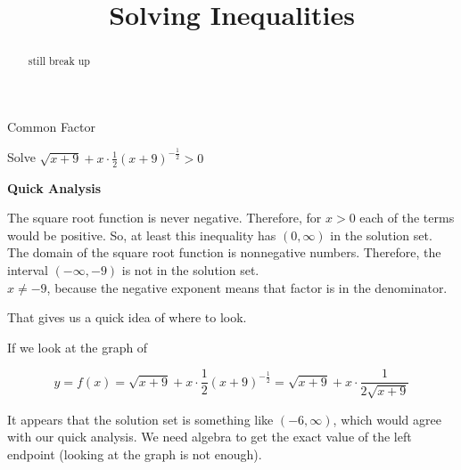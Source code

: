 \documentclass{ximera}
\title{Solving Inequalities}
\begin{document}
\begin{abstract}
still break up
\end{abstract}
\maketitle









\begin{example}  Common Factor


Solve $\sqrt{x+9} + x \cdot \frac{1}{2} (x+9)^{-\tfrac{1}{2}} > 0$





\begin{idea} \textbf{\textcolor{blue!55!black}{Quick Analysis}} 


The square root function is never negative.  Therefore, for $x > 0$ each of the terms would be positive.  So, at least this inequality has $(0, \infty)$ in the solution set.  \\


The domain of the square root function is nonnegative numbers.  Therefore, the interval $(-\infty, -9)$ is not in the solution set.   \\


$x \ne -9$, because the negative exponent means that factor is in the denominator.

\end{idea}



That gives us a quick idea of where to look.


\begin{explanation}






If we look at the graph of  

\[
y = f(x) = \sqrt{x+9} + x \cdot \frac{1}{2} (x+9)^{-\tfrac{1}{2}} = \sqrt{x+9} + x \cdot \frac{1}{2 \sqrt{x+9}} 
\]




\begin{center}
\end{center}




It appears that the solution set is something like  $(-6, \infty)$, which would agree with our quick analysis.  We need algebra to get the exact value of the left endpoint (looking at the graph is not enough).



\end{explanation}
\end{example}
\end{document}
